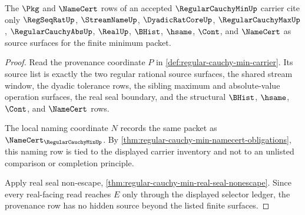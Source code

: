 \begin{theorem}
\label{thm:regular-cauchy-min-provenance-scope}
The $\Pkg$ and $\NameCert$ rows of an accepted $\RegularCauchyMinUp$ carrier cite only $\RegSeqRatUp$, $\StreamNameUp$, $\DyadicRatCoreUp$, $\RegularCauchyMaxUp$, $\RegularCauchyAbsUp$, $\RealUp$, $\BHist$, $\hsame$, $\Cont$, and $\NameCert$ as source surfaces for the finite minimum packet.
\end{theorem}
\begin{proof}
Read the provenance coordinate $P$ in \autoref{def:regular-cauchy-min-carrier}. Its source list is exactly the two regular rational source surfaces, the shared stream window, the dyadic tolerance rows, the sibling maximum and absolute-value operation surfaces, the real seal boundary, and the structural $\BHist$, $\hsame$, $\Cont$, and $\NameCert$ rows.

The local naming coordinate $N$ records the same packet as $\NameCert_{\RegularCauchyMinUp}$. By \autoref{thm:regular-cauchy-min-namecert-obligations}, this naming row is tied to the displayed carrier inventory and not to an unlisted comparison or completion principle.

Apply real seal non-escape, \autoref{thm:regular-cauchy-min-real-seal-nonescape}. Since every real-facing read reaches $E$ only through the displayed selector ledger, the provenance row has no hidden source beyond the listed finite surfaces.
\end{proof}

